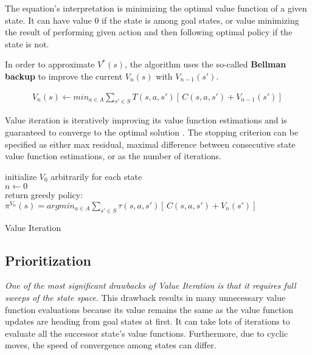 The equation's interpretation is minimizing the optimal value function of a given state. It can have value 0 if the state is among goal states, or value minimizing the result of performing given action and then following optimal policy if the state is not.

In order to approximate $V^* (s)$, the algorithm uses the so-called \textbf{Bellman backup} to improve the current $V_n (s)$ with $V_{n-1} (s')$.


\begin{equation}
\begin{aligned}
V_n (s) \xleftarrow{} min_{a \in A} \sum_{s' \in S} T(s, a, s') [ \,C(s, a, s') + V_{n - 1} (s')] \,
\end{aligned}
\end{equation}

Value iteration is iteratively improving its value function estimations and is guaranteed to converge to the optimal solution \cite{Kolobov2012}. The stopping criterion can be specified as either max residual, maximal difference between consecutive state value function estimations, or as the number of iterations.

\LinesNumbered
\begin{algorithm}
\SetAlgoLined
initialize $V_0$ arbitrarily for each state \\
$n \xleftarrow{} 0$ \\ 
return greedy policy: $\pi^{V_n} (s) = argmin_{a \in A} \sum_{s' \in S} \tau(s, a, s')[ \,C(s, a, s') + V_n (s')] \,$
\caption{Value Iteration}
\end{algorithm}


\subsection{Prioritization}
\textit{One of the most significant drawbacks of Value Iteration is that it requires full sweeps of the state space}. This drawback results in many unnecessary value function evaluations because its value remains the same as the value function updates are heading from goal states at first. It can take lots of iterations to evaluate all the successor state's value functions. Furthermore, due to cyclic moves, the speed of convergence among states can differ.

